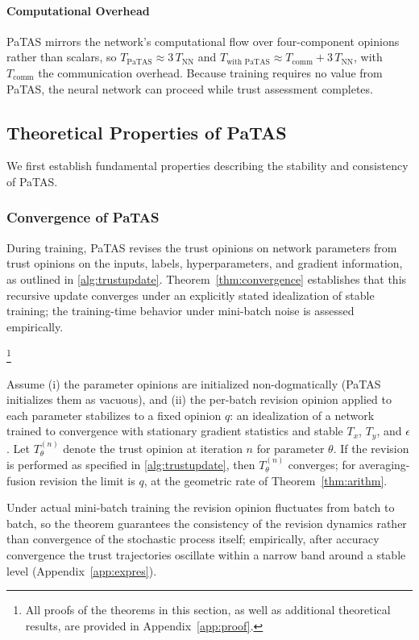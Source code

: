 \paragraph*{Computational Overhead}
PaTAS mirrors the network's computational flow over four-component opinions rather than scalars, so \(T_{\text{PaTAS}} \approx 3\,T_{\text{NN}}\) and \(T_{\text{with PaTAS}} \approx T_{\text{comm}} + 3\,T_{\text{NN}}\), with \(T_{\text{comm}}\) the communication overhead. Because training requires no value from PaTAS, the neural network can proceed while trust assessment completes.

\vspace{-0.5em}
\subsection{Theoretical Properties of PaTAS}\label{sec:ptastheory}
We first establish fundamental properties describing the stability and consistency of PaTAS.
\subsubsection{Convergence of PaTAS}
\label{sec:ptas_convergence}

During training, PaTAS revises the trust opinions on network parameters from trust opinions on the inputs, labels, hyperparameters, and gradient information, as outlined in \cref{alg:trustupdate}. Theorem~\ref{thm:convergence} establishes that this recursive update converges under an explicitly stated idealization of stable training; the training-time behavior under mini-batch noise is assessed empirically.



\begin{theorem}\label{thm:convergence}
\footnote{All proofs of the theorems in this section, as well as additional theoretical results, are provided in Appendix~\ref{app:proof}.}

Assume (i) the parameter opinions are initialized non-dogmatically (PaTAS initializes them as vacuous), and (ii) the per-batch revision opinion applied to each parameter stabilizes to a fixed opinion $q$: an idealization of a network trained to convergence with stationary gradient statistics and stable $T_x$, $T_y$, and $\epsilon$.
Let $T_\theta^{(n)}$ denote the trust opinion at iteration $n$ for parameter $\theta$. If the revision is performed as specified in \cref{alg:trustupdate}, then $T_\theta^{(n)}$ converges; for averaging-fusion revision the limit is $q$, at the geometric rate of Theorem~\ref{thm:arithm}.
\end{theorem}
Under actual mini-batch training the revision opinion fluctuates from batch to batch, so the theorem guarantees the consistency of the revision dynamics rather than convergence of the stochastic process itself; empirically, after accuracy convergence the trust trajectories oscillate within a narrow band around a stable level (Appendix~\ref{app:expres}).
